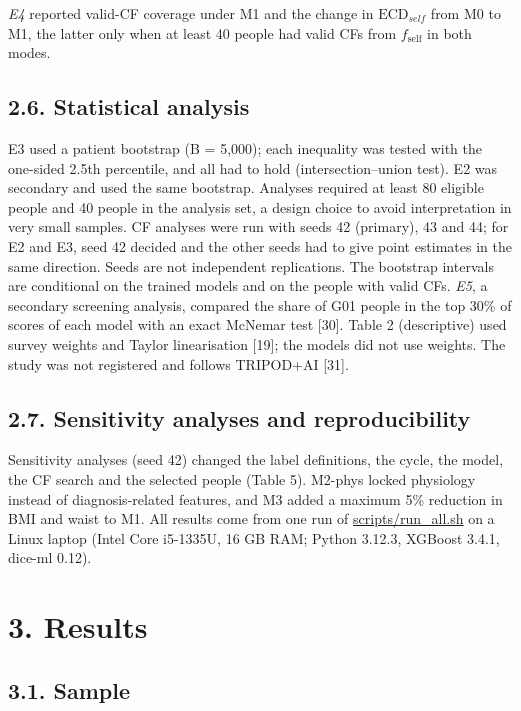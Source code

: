 \documentclass[
  11pt,
]{article}
\begin{document}
\emph{E4} reported valid-CF coverage under M1 and the change in
\(\mathrm{ECD}_{self}\) from M0 to M1, the latter only when at least 40
people had valid CFs from \(f_{\mathrm{self}}\) in both modes.

\subsection{2.6. Statistical analysis}

E3 used a patient bootstrap (B = 5,000); each inequality was tested with
the one-sided 2.5th percentile, and all had to hold (intersection--union
test). E2 was secondary and used the same bootstrap. Analyses required
at least 80 eligible people and 40 people in the analysis set, a design
choice to avoid interpretation in very small samples. CF analyses were
run with seeds 42 (primary), 43 and 44; for E2 and E3, seed 42 decided
and the other seeds had to give point estimates in the same direction.
Seeds are not independent replications. The bootstrap intervals are
conditional on the trained models and on the people with valid CFs.
\emph{E5}, a secondary screening analysis, compared the share of G01
people in the top 30\% of scores of each model with an exact McNemar
test {[}30{]}. Table 2 (descriptive) used survey weights and Taylor
linearisation {[}19{]}; the models did not use weights. The study was
not registered and follows TRIPOD+AI {[}31{]}.

\subsection{2.7. Sensitivity analyses and reproducibility}

Sensitivity analyses (seed 42) changed the label definitions, the cycle,
the model, the CF search and the selected people (Table 5). M2-phys
locked physiology instead of diagnosis-related features, and M3 added a
maximum 5\% reduction in BMI and waist to M1. All results come from one
run of \url{scripts/run_all.sh} on a Linux laptop (Intel Core i5-1335U,
16 GB RAM; Python 3.12.3, XGBoost 3.4.1, dice-ml 0.12).

\section{3. Results}

\subsection{3.1. Sample}
\end{document}
